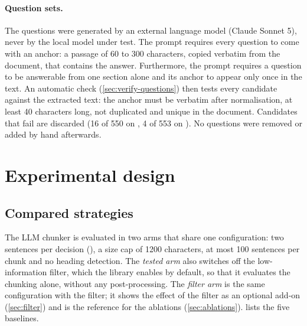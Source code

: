 \paragraph{Question sets.}
\label{sec:questions}
The questions were generated by an external language model (Claude Sonnet 5), never by the
local model under test. The prompt requires every question to come with an anchor: a
passage of 60 to 300 characters, copied verbatim from the document, that contains the
answer. Furthermore, the prompt requires a question to be answerable from one section
alone and its anchor to appear only once in the text. An automatic check
(\cref{sec:verify-questions}) then tests every candidate against the extracted text: the
anchor must be verbatim after normalisation, at least 40 characters long, not duplicated
and unique in the document. Candidates that fail are discarded (16 of 550 on ,
4 of 553 on ). No questions were removed or added by hand afterwards.

\section{Experimental design}
\label{sec:design}

\subsection{Compared strategies}

The LLM chunker is evaluated in two arms that share one configuration: two sentences per
decision (), a size cap of \num{1200} characters, at most 100
sentences per chunk and no heading detection. The \emph{tested arm} also switches off the
low-information filter, which the library enables by default, so that it evaluates the
chunking alone, without any post-processing. The \emph{filter arm} is the same
configuration with the filter; it shows the effect of the filter as an optional add-on
(\cref{sec:filter}) and is the reference for the ablations (\cref{sec:ablations}).
 lists the five baselines.

